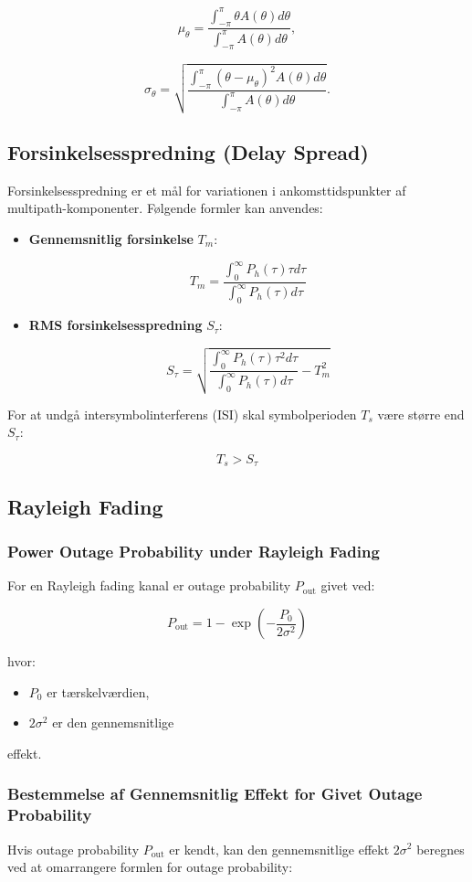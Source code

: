 \documentclass[a4paper,12pt]{book}
\begin{document}
	\[
	\mu_\theta = \frac{\int_{-\pi}^{\pi} \theta A(\theta) d\theta}{\int_{-\pi}^{\pi} A(\theta) d\theta},
	\]
	
	\[
	\sigma_\theta = \sqrt{\frac{\int_{-\pi}^{\pi} (\theta - \mu_\theta)^2 A(\theta) d\theta}{\int_{-\pi}^{\pi} A(\theta) d\theta}}.
	\]
	
	\subsection{Forsinkelsesspredning (Delay Spread)}
	Forsinkelsesspredning er et mål for variationen i ankomsttidspunkter af multipath-komponenter. Følgende formler kan anvendes:
	
	\begin{itemize}
		\item \textbf{Gennemsnitlig forsinkelse} \( T_m \):
	
	\[
	T_m = \frac{\int_0^\infty P_h(\tau) \tau d\tau}{\int_0^\infty P_h(\tau) d\tau}
	\]
	
	\item  \textbf{RMS forsinkelsesspredning} \( S_\tau \):
	
	\[
	S_\tau = \sqrt{\frac{\int_0^\infty P_h(\tau) \tau^2 d\tau}{\int_0^\infty P_h(\tau) d\tau} - T_m^2}
	\]
	\end{itemize}
	
	For at undgå intersymbolinterferens (ISI) skal symbolperioden \( T_s \) være større end \( S_\tau \):
	
	\[
	T_s > S_\tau
	\]
	
	\subsection{Rayleigh Fading}
	\subsubsection{Power Outage Probability under Rayleigh Fading}
	For en Rayleigh fading kanal er outage probability \( P_\text{out} \) givet ved:
	
	\[
	P_\text{out} = 1 - \exp\left(-\frac{P_0}{2\sigma^2}\right)
	\]
	
	hvor:
	\begin{itemize}
		\item \( P_0 \) er tærskelværdien,
		\item \( 2\sigma^2 \) er den gennemsnitlige
	\end{itemize} effekt.
	
	\subsubsection{Bestemmelse af Gennemsnitlig Effekt for Givet Outage Probability}
	Hvis outage probability \( P_\text{out} \) er kendt, kan den gennemsnitlige effekt \( 2\sigma^2 \) beregnes ved at omarrangere formlen for outage probability:
	
\end{document}
